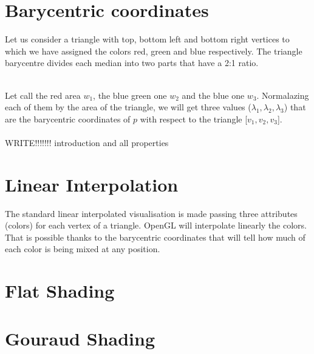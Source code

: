 \section{Barycentric coordinates}
Let us consider a triangle with top, bottom left and bottom right vertices to which we have assigned the colors red, green and blue respectively. The triangle barycentre divides each median into two parts that have a 2:1 ratio. \\
    \\
    Let call the red area $w_1$, the blue green one $w_2$ and the blue one $w_3$. Normalazing each of them by the area of the triangle, we will get three values ($\lambda_1, \lambda_2, \lambda_3$) that are the barycentric coordinates of $p$ with respect to the triangle [$v_1, v_2, v_3$].
\\ \\ WRITE!!!!!!! introduction and all properties

\section{Linear Interpolation}
The standard linear interpolated visualisation is made passing three attributes (colors) for each vertex of a triangle. OpenGL will interpolate linearly the colors. That is possible thanks to the barycentric coordinates that will tell how much of each color is being mixed at any position.

\section{Flat Shading}

\section{Gouraud Shading}